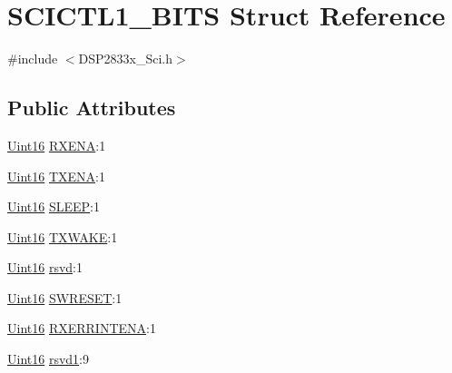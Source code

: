 \hypertarget{struct_s_c_i_c_t_l1___b_i_t_s}{}\section{S\+C\+I\+C\+T\+L1\+\_\+\+B\+I\+T\+S Struct Reference}
\label{struct_s_c_i_c_t_l1___b_i_t_s}


{\ttfamily \#include $<$D\+S\+P2833x\+\_\+\+Sci.\+h$>$}

\subsection*{Public Attributes}
\begin{DoxyCompactItemize}
\item 
\hyperlink{_d_s_p2833x___device_8h_a59a9f6be4562c327cbfb4f7e8e18f08b}{Uint16} \hyperlink{struct_s_c_i_c_t_l1___b_i_t_s_a13bf886b1b621f0e9ae312a24d849c76}{R\+X\+E\+N\+A}\+:1
\item 
\hyperlink{_d_s_p2833x___device_8h_a59a9f6be4562c327cbfb4f7e8e18f08b}{Uint16} \hyperlink{struct_s_c_i_c_t_l1___b_i_t_s_a033c62efc7475bb7e662bce4be705cd7}{T\+X\+E\+N\+A}\+:1
\item 
\hyperlink{_d_s_p2833x___device_8h_a59a9f6be4562c327cbfb4f7e8e18f08b}{Uint16} \hyperlink{struct_s_c_i_c_t_l1___b_i_t_s_ad43cc24495aa5d6a373b78bcb400781a}{S\+L\+E\+E\+P}\+:1
\item 
\hyperlink{_d_s_p2833x___device_8h_a59a9f6be4562c327cbfb4f7e8e18f08b}{Uint16} \hyperlink{struct_s_c_i_c_t_l1___b_i_t_s_af3b1d1ace1efe6a5f380d3e6635b1148}{T\+X\+W\+A\+K\+E}\+:1
\item 
\hyperlink{_d_s_p2833x___device_8h_a59a9f6be4562c327cbfb4f7e8e18f08b}{Uint16} \hyperlink{struct_s_c_i_c_t_l1___b_i_t_s_a77dd158aa2881ac1d462c1c7fd2e74af}{rsvd}\+:1
\item 
\hyperlink{_d_s_p2833x___device_8h_a59a9f6be4562c327cbfb4f7e8e18f08b}{Uint16} \hyperlink{struct_s_c_i_c_t_l1___b_i_t_s_a8e8db58883800d100a7b2a8377067445}{S\+W\+R\+E\+S\+E\+T}\+:1
\item 
\hyperlink{_d_s_p2833x___device_8h_a59a9f6be4562c327cbfb4f7e8e18f08b}{Uint16} \hyperlink{struct_s_c_i_c_t_l1___b_i_t_s_aef11fe82746f6d9e72517a24a5463ec0}{R\+X\+E\+R\+R\+I\+N\+T\+E\+N\+A}\+:1
\item 
\hyperlink{_d_s_p2833x___device_8h_a59a9f6be4562c327cbfb4f7e8e18f08b}{Uint16} \hyperlink{struct_s_c_i_c_t_l1___b_i_t_s_ab1d37fda1bfdb4bacb07228b21f27499}{rsvd1}\+:9
\end{DoxyCompactItemize}


